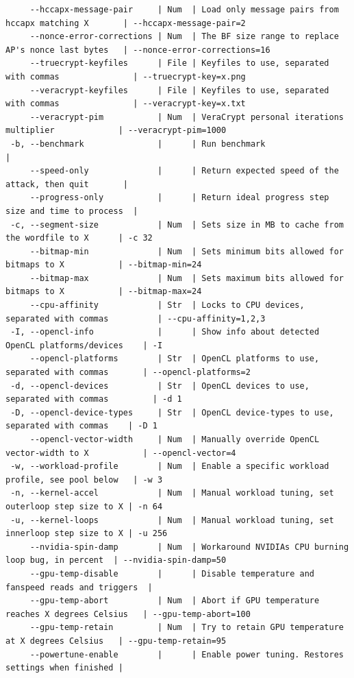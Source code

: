 \documentclass{article}
\begin{document}
\begin{lstlisting}
     --hccapx-message-pair     | Num  | Load only message pairs from hccapx matching X       | --hccapx-message-pair=2
     --nonce-error-corrections | Num  | The BF size range to replace AP's nonce last bytes   | --nonce-error-corrections=16
     --truecrypt-keyfiles      | File | Keyfiles to use, separated with commas               | --truecrypt-key=x.png
     --veracrypt-keyfiles      | File | Keyfiles to use, separated with commas               | --veracrypt-key=x.txt
     --veracrypt-pim           | Num  | VeraCrypt personal iterations multiplier             | --veracrypt-pim=1000
 -b, --benchmark               |      | Run benchmark                                        |
     --speed-only              |      | Return expected speed of the attack, then quit       |
     --progress-only           |      | Return ideal progress step size and time to process  |
 -c, --segment-size            | Num  | Sets size in MB to cache from the wordfile to X      | -c 32
     --bitmap-min              | Num  | Sets minimum bits allowed for bitmaps to X           | --bitmap-min=24
     --bitmap-max              | Num  | Sets maximum bits allowed for bitmaps to X           | --bitmap-max=24
     --cpu-affinity            | Str  | Locks to CPU devices, separated with commas          | --cpu-affinity=1,2,3
 -I, --opencl-info             |      | Show info about detected OpenCL platforms/devices    | -I
     --opencl-platforms        | Str  | OpenCL platforms to use, separated with commas       | --opencl-platforms=2
 -d, --opencl-devices          | Str  | OpenCL devices to use, separated with commas         | -d 1
 -D, --opencl-device-types     | Str  | OpenCL device-types to use, separated with commas    | -D 1
     --opencl-vector-width     | Num  | Manually override OpenCL vector-width to X           | --opencl-vector=4
 -w, --workload-profile        | Num  | Enable a specific workload profile, see pool below   | -w 3
 -n, --kernel-accel            | Num  | Manual workload tuning, set outerloop step size to X | -n 64
 -u, --kernel-loops            | Num  | Manual workload tuning, set innerloop step size to X | -u 256
     --nvidia-spin-damp        | Num  | Workaround NVIDIAs CPU burning loop bug, in percent  | --nvidia-spin-damp=50
     --gpu-temp-disable        |      | Disable temperature and fanspeed reads and triggers  |
     --gpu-temp-abort          | Num  | Abort if GPU temperature reaches X degrees Celsius   | --gpu-temp-abort=100
     --gpu-temp-retain         | Num  | Try to retain GPU temperature at X degrees Celsius   | --gpu-temp-retain=95
     --powertune-enable        |      | Enable power tuning. Restores settings when finished |

\end{lstlisting}
\end{document}
